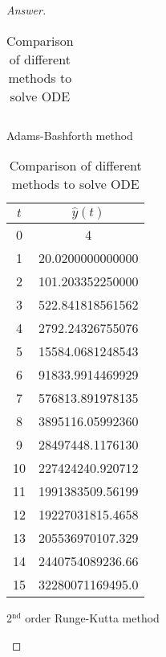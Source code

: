 \begin{proof}[Answer]
\begin{table}[H]
\begin{table}[htbp]
\begin{subtable}[t]{0.32\textwidth}
\begin{tabular}[t]{|c|c|}
		\end{tabular}
		\caption{Adams-Bashforth method}
	\end{subtable}
	\begin{subtable}[t]{0.32\textwidth}
		\centering
		\begin{tabular}[t]{|c|c|}
		\hline
		\(t\)	&	\(\hat{y}(t)\)	\\	\hline
		0	&	4					\\	\hline
		1	&	20.0200000000000	\\	\hline
		2	&	101.203352250000	\\	\hline
		3	&	522.841818561562	\\	\hline
		4	&	2792.24326755076	\\	\hline
		5	&	15584.0681248543	\\	\hline
		6	&	91833.9914469929	\\	\hline
		7	&	576813.891978135	\\	\hline
		8	&	3895116.05992360	\\	\hline
		9	&	28497448.1176130	\\	\hline
		10	&	227424240.920712	\\	\hline
		11	&	1991383509.56199	\\	\hline
		12	&	19227031815.4658	\\	\hline
		13	&	205536970107.329	\\	\hline
		14	&	2440754089236.66	\\	\hline
		15	&	32280071169495.0	\\	\hline
		\end{tabular}
		\caption{2\(^\text{nd}\) order Runge-Kutta method}
	\end{subtable}

	\caption{Comparison of different methods to solve ODE}
	\label{odecomparisontab}
\end{table}


\end{table}
\end{proof}
